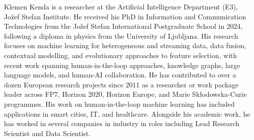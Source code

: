 \documentclass{ieeeaccess}
\begin{document}
\begin{IEEEbiography}{Klemen Kenda} is a researcher at the Artificial
Intelligence Department (E3), Jožef Stefan Institute. He received his PhD in Information and
Communication Technologies from the Jožef
Stefan International Postgraduate School in 2024,
following a diploma in physics from the University
of Ljubljana. His research focuses on machine
learning for heterogeneous and streaming data,
data fusion, contextual modelling, and evolutionary
approaches to feature selection, with recent work
spanning human-in-the-loop approaches,
knowledge graphs, large language models, and
human-AI collaboration. He has contributed to
over a dozen European research projects since
2011 as a researcher or work package leader
across FP7, Horizon 2020, Horizon Europe, and
Marie Skłodowska-Curie programmes. His work on
human-in-the-loop machine learning has included
applications in smart cities, IT, and healthcare.
Alongside his academic work, he has worked in
several companies in industry in roles including
Lead Research Scientist and Data Scientist.
\end{IEEEbiography}



\EOD
\end{document}
